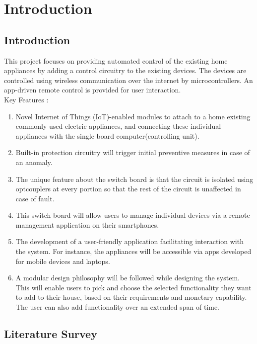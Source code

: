 \chapter{Introduction}
        \section{Introduction}
        This project focuses on providing automated control of the existing home appliances by adding a control circuitry to the existing devices. The devices are controlled using wireless communication over the internet by microcontrollers. An app-driven remote control is provided for user interaction. \\
        
        Key Features :
        \begin{enumerate}
        \item Novel Internet of Things (IoT)-enabled modules to attach to a home existing commonly used electric appliances, and connecting these individual appliances with the single board computer(controlling unit). 
		\item Built-in protection circuitry will trigger initial preventive measures in case of an anomaly.
		\item The unique feature about the switch board is that the circuit is isolated using optcouplers at every portion so that the rest of the circuit is unaffected in case of fault.
		\item This switch board will allow users to manage individual devices via a remote management application on their smartphones.
		\item The development of a user-friendly application facilitating interaction with the system. For instance, the appliances will be accessible via apps developed for mobile devices and laptops.
		\item A modular design philosophy will be followed while designing the system. This will enable users to pick and choose the selected functionality they want to add to their house, based on their requirements and monetary capability. The user can also add functionality over an extended span of time.

        \end{enumerate}
        \section{Literature Survey}
